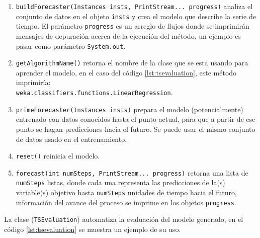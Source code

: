 \begin{enumerate}
	\item \texttt{buildForecaster(Instances insts, PrintStream... progress)} analiza el conjunto de datos en el objeto
			\texttt{insts} y crea el modelo que describe la serie de tiempo. El parámetro \texttt{progress} es un arreglo de flujos 
			donde se imprimirán mensajes de depuración acerca de la ejecución del método, un ejemplo es pasar como parámetro
			\texttt{System.out}.
			
	\item \texttt{getAlgorithmName()} retorna el nombre de la clase que se esta usando para aprender el modelo, en el caso del
			código \ref{lst:tsevaluation}, este método imprimiría: \\ \texttt{weka.classifiers.functions.LinearRegression}.
			
	\item \texttt{primeForecaster(Instances insts)} prepara el modelo (potencialmente) entrenado con datos conocidos hasta el punto 
			actual, para que a partir de ese punto se hagan predicciones hacia el futuro. Se puede usar el mismo conjunto de datos
			usado en el entrenamiento. 
			
	\item \texttt{reset()} reinicia el modelo.
	
	\item \texttt{forecast(int numSteps, PrintStream... progress)} retorna una lista de \texttt{numSteps} listas, donde cada una
			representa las predicciones de la(s) variable(s) objetivo hasta \texttt{numSteps} unidades de tiempo hacia el futuro,
			información del avance del	proceso se imprime en los objetos \texttt{progress}.
\end{enumerate}

La clase (\texttt{TSEvaluation}) automatiza la evaluación del modelo generado, en el código \ref{lst:tsevaluation} se muestra un ejemplo de su uso. 


